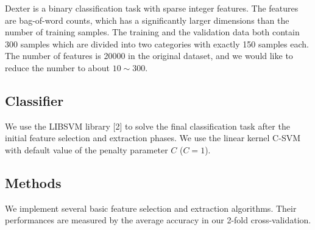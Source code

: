 \documentclass{article} %
\begin{document}
	Dexter is a binary classification task with sparse integer features. The features are bag-of-word counts, which has a significantly larger dimensions than the number of training samples. The training and the validation data both contain 300 samples which are divided into two categories with exactly 150 samples each. The number of features is 20000 in the original dataset, and we would like to reduce the number to about $10\sim 300$.
	
	\subsection{Classifier}
	We use the LIBSVM library [2] to solve the final classification task after the initial feature selection and extraction phases. We use the linear kernel C-SVM with default value of the penalty parameter $C$ ($C=1$).
	
	\subsection{Methods}
	We implement several basic feature selection and extraction algorithms. Their performances are measured by the average accuracy in our 2-fold cross-validation.
\end{document}
